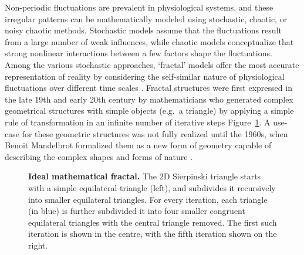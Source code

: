 \documentclass[
  sn-vancouver,
  Numbered,
  referee,
  lineno]{sn-jnl}
\begin{document}
Non-periodic fluctuations are prevalent in physiological systems, and
these irregular patterns can be mathematically modeled using stochastic,
chaotic, or noisy chaotic methods. Stochastic models assume that the
fluctuations result from a large number of weak influences, while
chaotic models conceptualize that strong nonlinear interactions between
a few factors shape the fluctuations. Among the various stochastic
approaches, `fractal' models offer the most accurate representation of
reality by considering the self-similar nature of physiological
fluctuations over different time scales
\citep{ekeFractalCharacterizationComplexity2002}. Fractal structures
were first expressed in the late 19th and early 20th century by
mathematicians who generated complex geometrical structures with simple
objects (e.g.~a triangle) by applying a simple rule of transformation in
an infinite number of iterative steps Figure~\ref{fig-fractal}. A
use-case for these geometric structures was not fully realized until the
1960s, when Benoit Mandelbrot formalized them as a new form of geometry
capable of describing the complex shapes and forms of nature
\citep{mandelbrotHowLongCoast1967}.

\begin{figure}[H]


\caption{\label{fig-fractal}\textbf{Ideal mathematical fractal.} The 2D
Sierpinski triangle starts with a simple equilateral triangle (left),
and subdivides it recursively into smaller equilateral triangles. For
every iteration, each triangle (in blue) is further subdivided it into
four smaller congruent equilateral triangles with the central triangle
removed. The first such iteration is shown in the centre, with the fifth
iteration shown on the right.}

\end{figure}%
\end{document}
